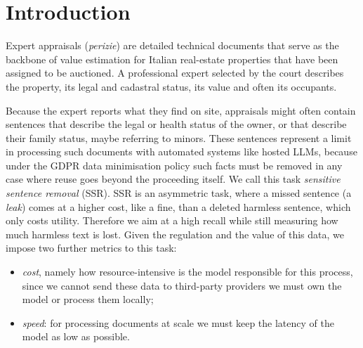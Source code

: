 \documentclass[11pt]{article}
\begin{document}

\section{Introduction}
\label{sec:introduction}

Expert appraisals (\emph{perizie}) are detailed technical documents that serve as the backbone of value estimation for Italian real-estate properties that have been assigned to be auctioned. A professional expert selected by the court describes the property, its legal and cadastral status, its value and often its occupants.

Because the expert reports what they find on site, appraisals might often contain sentences that describe the legal or health status of the owner, or that describe their family status, maybe referring to minors. These sentences represent a limit in processing such documents with automated systems like hosted LLMs, because under the GDPR data minimisation policy \citep[art.~5(1)(b)--(c)]{gdpr} such facts must be removed in any case where reuse goes beyond the proceeding itself. We call this task \emph{sensitive sentence removal} (SSR). SSR is an asymmetric task, where a missed sentence (a \emph{leak}) comes at a higher cost, like a fine, than a deleted harmless sentence, which only costs utility. Therefore we aim at a high recall while still measuring how much harmless text is lost. Given the regulation and the value of this data, we impose two further metrics to this task:
{
\begin{itemize}\itemsep0pt
\item \emph{cost}, namely how resource-intensive is the model responsible for this process, since we cannot send these data to third-party providers we must own the model or process them locally;
\item \emph{speed}: for processing documents at scale we must keep the latency of the model as low as possible.
\end{itemize}}
\end{document}
